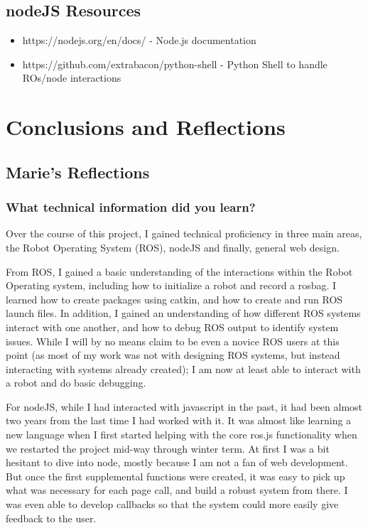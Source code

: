 \documentclass[onecolumn, draftclsnofoot,10pt, compsoc]{report}
\begin{document}
\section{nodeJS Resources}
\begin{itemize}
	\item https://nodejs.org/en/docs/ - Node.js documentation
	\item https://github.com/extrabacon/python-shell - Python Shell to handle ROs/node interactions
\end{itemize}
\chapter{Conclusions and Reflections}
\minitoc
\section{Marie's Reflections}
\subsection{What technical information did you learn?}
Over the course of this project, I gained technical proficiency in three main areas, the Robot Operating System (ROS), nodeJS and finally, general web design. 

From ROS, I gained a basic understanding of the interactions within the Robot Operating system, including how to initialize a robot and record a rosbag. I learned how to create packages using catkin, and how to create and run ROS launch files. In addition, I gained an understanding of how different ROS systems interact with one another, and how to debug ROS output to identify system issues. While I will by no means claim to be even a novice ROS users at this point (as most of my work was not with designing ROS systems, but instead interacting with systems already created); I am now at least able to interact with a robot and do basic debugging. 

For nodeJS, while I had interacted with javascript in the past, it had been almost two years from the last time I had worked with it. It was almost like learning a new language when I first started helping with the core ros.js functionality when we restarted the project mid-way through winter term. At first I was a bit hesitant to dive into node, mostly because I am not a fan of web development. But once the first supplemental functions were created, it was easy to pick up what was necessary for each page call, and build a robust system from there. I was even able to develop callbacks so that the system could more easily give feedback to the user. 
\end{document}
